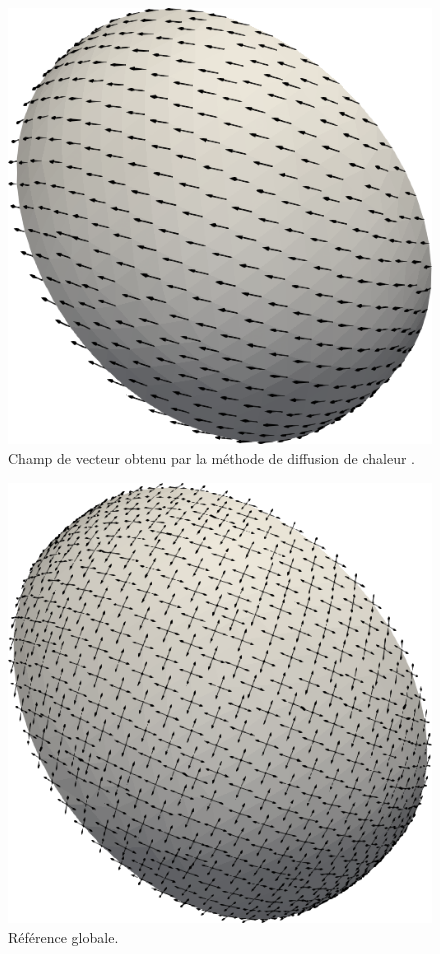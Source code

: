 \begin{figure}[!h]
\centering
\includegraphics[scale=0.4]{images/vector.png}
\caption{Champ de vecteur obtenu par la méthode de diffusion de chaleur \cite{sharp2019vector}.}
\label{solutionheat}
\end{figure}

\begin{figure}[!h]
\centering
\includegraphics[scale=0.4]{images/frame.png}
\caption{Référence globale.}
\label{globalframe}
\end{figure}

